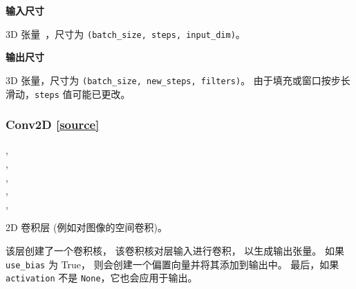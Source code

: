 \textbf{输入尺寸}

3D 张量~，尺寸为 \texttt{(batch\_size,\ steps,\ input\_dim)}。

\textbf{输出尺寸}

3D 张量，尺寸为 \texttt{(batch\_size,\ new\_steps,\ filters)}。
由于填充或窗口按步长滑动，\texttt{steps} 值可能已更改。


\subsubsection{Conv2D {\href{https://github.com/keras-team/keras/blob/master/keras/layers/convolutional.py\#L347}{{[}source{]}}}}

\begin{Shaded}
\begin{Highlighting}[]
\OperatorTok{=}\NormalTok{(}\NormalTok{, }\OperatorTok{=}, \\
\hspace{3cm}\OperatorTok{=}\OperatorTok{=}\NormalTok{(}\NormalTok{, }\OperatorTok{=}, \\
\hspace{3cm}\OperatorTok{=}\OperatorTok{=}, \\
\hspace{3cm}\OperatorTok{=}\OperatorTok{=}, \\
\hspace{3cm}\OperatorTok{=}\OperatorTok{=}, \\
\hspace{3cm}\OperatorTok{=}\OperatorTok{=}\NormalTok{)}
\end{Highlighting}
\end{Shaded}

2D 卷积层 (例如对图像的空间卷积)。

该层创建了一个卷积核， 该卷积核对层输入进行卷积， 以生成输出张量。 如果
\texttt{use\_bias} 为 True， 则会创建一个偏置向量并将其添加到输出中。
最后，如果 \texttt{activation} 不是 \texttt{None}，它也会应用于输出。

